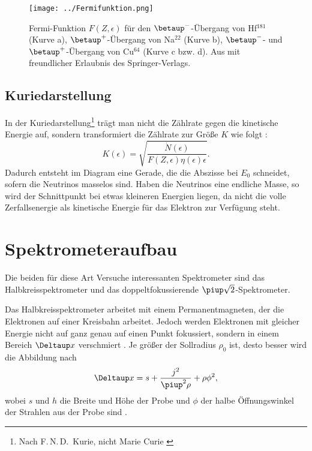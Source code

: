 \documentclass[11pt, ngerman, fleqn, DIV=15, headinclude, BCOR=2cm]{scrreprt}
\begin{document}
\begin{figure}[htbp]
    \centering
    \texttt{[image: ../Fermifunktion.png]}
    \caption{%
        Fermi-Funktion $F(Z, \epsilon)$ für den $\betaminus$-Übergang von
        Hf$^{181}$ (Kurve a), $\betaplus$-Übergang von Na$^{22}$ (Kurve b),
        $\betaminus$- und $\betaplus$-Übergang von Cu$^{64}$ (Kurve c bzw\@.
        d). Aus \parencite[Fig. 111]{Riezler/Kernphysikalisches} mit
        freundlicher Erlaubnis des Springer-Verlags.
    }
    \label{fig:fermifunktion}
\end{figure}

\subsection{Kuriedarstellung}

In der Kuriedarstellung\footnote{Nach F.\,N.\,D\@.~Kurie, nicht Marie Curie
\parencite{wikipedia/Kurie}} trägt man nicht die Zählrate gegen die kinetische
Energie auf, sondern transformiert die Zählrate zur Größe $K$ wie folgt
\parencite[(138)]{Riezler/Kernphysikalisches}:
\begin{equation}
    K(\epsilon) = \sqrt{\frac{\dot N(\epsilon)}{F(Z, \epsilon) \eta(\epsilon)
    \epsilon}}. \label{eq:Kurie}
\end{equation}
Dadurch entsteht im Diagram eine Gerade, die die Abszisse bei $E_0$ schneidet,
sofern die Neutrinos masselos sind. Haben die Neutrinos eine endliche Masse, so
wird der Schnittpunkt bei etwas kleineren Energien liegen, da nicht die volle
Zerfallsenergie als kinetische Energie für das Elektron zur Verfügung steht.

\section{Spektrometeraufbau}

Die beiden für diese Art Versuche interessanten Spektrometer sind das
Halbkreisspektrometer und das doppeltfokussierende $\piup \sqrt
2$-Spektrometer.

Das Halbkreisspektrometer arbeitet mit einem Permanentmagneten, der die
Elektronen auf einer Kreisbahn arbeitet. Jedoch werden Elektronen mit gleicher
Energie nicht auf ganz genau auf einen Punkt fokussiert, sondern in einem
Bereich $\Deltaup x$ verschmiert
\parencite[§2.231]{Riezler/Kernphysikalisches}. Je größer der Sollradius
$\rho_0$ ist, desto besser wird die Abbildung nach 
\[
    \Deltaup x = s + \frac{j^2}{\piup^2 \rho} + \rho \phi^2,
\]
wobei $s$ und $h$ die Breite und Höhe der Probe und $\phi$ der halbe
Öffnungswinkel der Strahlen aus der Probe sind
\parencite[(123)]{Riezler/Kernphysikalisches}.
\end{document}
